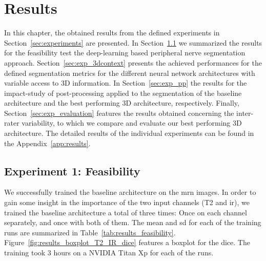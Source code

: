 \chapter{Results} \label{chap:results}
In this chapter, the obtained results from the defined experiments in Section~\ref{sec:experiments} are presented. In Section~\ref{sec:exp_feas} we summarized the results for the feasibility test the deep-learning based peripheral nerve segmentation approach.
Section~\ref{sec:exp_3dcontext} presents the achieved performances for the defined segmentation metrics for the different neural network architectures with variable access to 3D information.
In Section~\ref{sec:exp_pp} the results for the impact-study of post-processing applied to the segmentation of the baseline architecture and the best performing 3D architecture, respectively.
Finally, Section~\ref{sec:exp_evaluation} features the results obtained concerning the inter-rater variability, to which we compare and evaluate our best performing 3D architecture.
The detailed results of the individual experiments can be found in the Appendix~\ref{app:results}.

\section{Experiment 1: Feasibility} \label{sec:exp_feas} %
We successfully trained the baseline architecture on the \gls{mrn} images. In order to gain some insight in the importance of the two input channels (T2 and \gls{ir}), we trained the baseline architecture a total of three times: Once on each channel separately, and once with both of them. The mean and \gls{sd} for each of the training runs are summarized in Table~\ref{tab:results_feasibility}. Figure~\ref{fig:results_boxplot_T2_IR_dice} features a boxplot for the \acrlong{dice}. The training took 3 hours on a NVIDIA Titan Xp for each of the runs.

